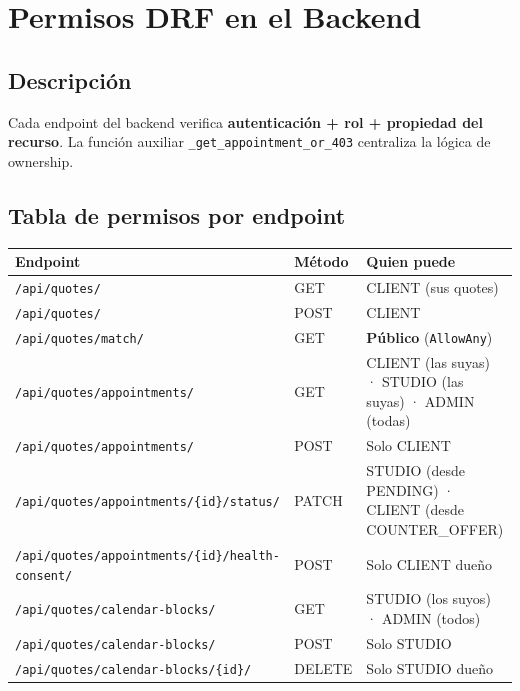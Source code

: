 \documentclass[11pt,a4paper]{article}
\begin{document}
\section{Permisos DRF en el Backend}

\subsection{Descripción}

Cada endpoint del backend verifica \textbf{autenticación + rol + propiedad del recurso}.
La función auxiliar \texttt{\_get\_appointment\_or\_403} centraliza la lógica de ownership.

\subsection{Tabla de permisos por endpoint}

\begin{center}
\begin{tabularx}{\textwidth}{llX}
\toprule
\rowcolor{blkMid}
\textcolor{blkGold}{\textbf{Endpoint}} &
\textcolor{blkGold}{\textbf{Método}} &
\textcolor{blkGold}{\textbf{Quien puede}}\\
\midrule
\texttt{/api/quotes/} & GET & CLIENT (sus quotes)\\
\rowcolor{blkMid}
\texttt{/api/quotes/} & POST & CLIENT\\
\texttt{/api/quotes/match/} & GET & \textbf{Público} (\texttt{AllowAny})\\
\rowcolor{blkMid}
\texttt{/api/quotes/appointments/} & GET & CLIENT (las suyas) · STUDIO (las suyas) · ADMIN (todas)\\
\texttt{/api/quotes/appointments/} & POST & Solo CLIENT\\
\rowcolor{blkMid}
\texttt{/api/quotes/appointments/\{id\}/status/} & PATCH & STUDIO (desde PENDING) · CLIENT (desde COUNTER\_OFFER)\\
\texttt{/api/quotes/appointments/\{id\}/health-consent/} & POST & Solo CLIENT dueño\\
\rowcolor{blkMid}
\texttt{/api/quotes/calendar-blocks/} & GET & STUDIO (los suyos) · ADMIN (todos)\\
\texttt{/api/quotes/calendar-blocks/} & POST & Solo STUDIO\\
\rowcolor{blkMid}
\texttt{/api/quotes/calendar-blocks/\{id\}/} & DELETE & Solo STUDIO dueño\\
\bottomrule
\end{tabularx}
\end{center}
\end{document}
